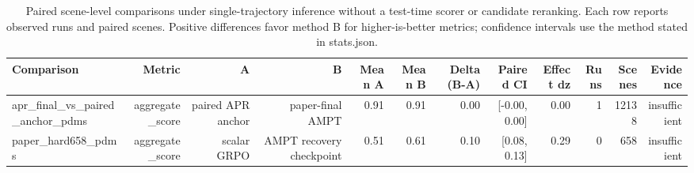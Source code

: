 \begin{table}[t]
\centering
\small
\caption{Paired scene-level comparisons under single-trajectory inference without a test-time scorer or candidate reranking. Each row reports observed runs and paired scenes. Positive differences favor method B for higher-is-better metrics; confidence intervals use the method stated in stats.json.}
\label{tab:supp_paired_comparisons}
\begin{tabular}{lrrrrrrrrrrr}
\toprule
Comparison & Metric & A & B & Mean A & Mean B & Delta (B-A) & Paired CI & Effect dz & Runs & Scenes & Evidence \\
\midrule
apr\_final\_vs\_paired\_anchor\_pdms & aggregate\_score & paired APR anchor & paper-final AMPT & 0.91 & 0.91 & 0.00 & [-0.00, 0.00] & 0.00 & 1 & 12138 & insufficient \\
paper\_hard658\_pdms & aggregate\_score & scalar GRPO & AMPT recovery checkpoint & 0.51 & 0.61 & 0.10 & [0.08, 0.13] & 0.29 & 0 & 658 & insufficient \\
\bottomrule
\end{tabular}
\end{table}

